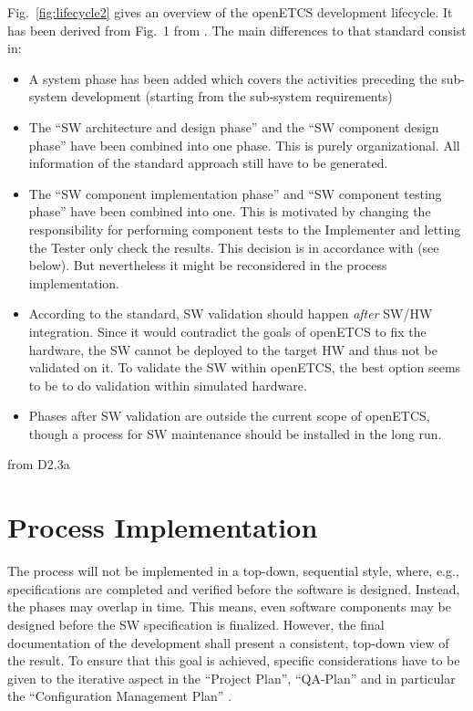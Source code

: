 \documentclass{template/openetcs_report}
\begin{document}
Fig.~\ref{fig:lifecycle2} gives an overview of the openETCS
development lifecycle. It has been derived from Fig.~1 from
\cite{EN50128:2011}. The main differences to that standard consist in:
\begin{itemize}
\item A system phase has been added which covers the activities preceding
  the sub-system development (starting from the sub-system requirements)
\item The ``SW architecture and design phase'' and the ``SW component
  design phase'' have been combined into one phase. This is purely
  organizational. All information of the standard approach still have
  to be generated.
\item The ``SW component implementation phase'' and ``SW component
  testing phase'' have been combined into one. This is motivated by
  changing the responsibility for performing component tests to the
  Implementer and letting the Tester only check the results. This
  decision is in accordance with \cite[6.1.4.1 to
  6.1.4.5]{EN50128:2011} (see below). But nevertheless it might be
  reconsidered in the process implementation.
\item According to the standard, SW validation should happen
  \emph{after} SW/HW integration. Since it would contradict the goals
  of openETCS to fix the hardware, the SW cannot be deployed to the
  target HW and thus not be validated on it. To validate the SW within
  openETCS, the best option seems to be to do validation within
  simulated hardware.
\item Phases after SW validation are outside the current scope of
  openETCS, though a process for SW maintenance should be installed in
  the long run.
\end{itemize}

from D2.3a

\section{Process Implementation}
\label{sec:proc-impl}

The process will not be implemented in a top-down, sequential style,
where, e.g., specifications are completed and verified before the
software is designed. Instead, the phases may overlap in time. This
means, even software components may be designed before the SW
specification is finalized. However, the final documentation of the
development shall present a consistent, top-down view of the
result. To ensure that this goal is achieved, specific considerations
have to be given to the iterative aspect in the ``Project Plan'',
``QA-Plan'' and in particular the ``Configuration Management Plan'' .
\end{document}
